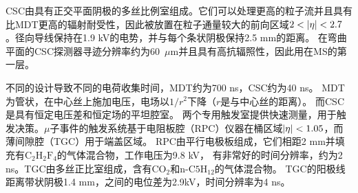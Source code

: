 CSC由具有正交平面阴极的多丝比例室组成。它们可以处理更高的粒子流并且具有比MDT更高的辐射耐受性，因此被放置在粒子通量较大的前向区域$2<\abseta<2.7$。径向导线保持在1.9 kV的电势，并与每个条状阴极保持2.5 mm的距离。
在弯曲平面的CSC探测器寻迹分辨率约为60~$\mu\text{m}$并且具有高抗辐照性，因此用在MS的第一层。

不同的设计导致不同的电荷收集时间，MDT约为700 ns，CSC约为40 ns。
MDT为管状，在中心丝上施加电压，电场以$1/r^{2}$下降（$r$是与中心丝的距离）。
而CSC是具有恒定电压差和恒定场的平坦腔室。
两个专用触发室提供快速测量，用于触发决策。$\mu$子事件的触发系统基于电阻板腔（RPC）\cite{Aielli:2006hg}仪器在桶区域$|\eta|<1.05$，而薄间隙腔（TGC）\cite{Majewski:1984ag}用于端盖区域。 
RPC由平行电极板组成，它们相距2 mm并填充有$\text{C}_{2}\text{H}_{2}\text{F}_{4}$的气体混合物，工作电压为9.8 kV，
有非常好的时间分辨率，约为2 ns。TGC由多丝正比室组成，含有$\text{CO}_{2}$和$\text{n-C5H}_{12}$的气体混合物。
TGC的阳极线距离带状阴极1.4 mm，之间的电位差为2.9kV，时间分辨率为4 ns。
